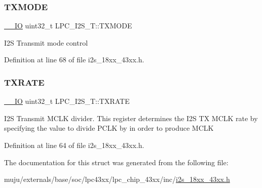 \subsubsection{\texorpdfstring{T\+X\+M\+O\+DE}{TXMODE}}
{\footnotesize\ttfamily \hyperlink{core__sc300_8h_aec43007d9998a0a0e01faede4133d6be}{\+\_\+\+\_\+\+IO} uint32\+\_\+t L\+P\+C\+\_\+\+I2\+S\+\_\+\+T\+::\+T\+X\+M\+O\+DE}

I2S Transmit mode control 

Definition at line 68 of file i2s\+\_\+18xx\+\_\+43xx.\+h.

\mbox{\label{struct_l_p_c___i2_s___t_ab62a8a48830412bcf4cec1b1ed5a5b21}} 
\subsubsection{\texorpdfstring{T\+X\+R\+A\+TE}{TXRATE}}
{\footnotesize\ttfamily \hyperlink{core__sc300_8h_aec43007d9998a0a0e01faede4133d6be}{\+\_\+\+\_\+\+IO} uint32\+\_\+t L\+P\+C\+\_\+\+I2\+S\+\_\+\+T\+::\+T\+X\+R\+A\+TE}

I2S Transmit M\+C\+LK divider. This register determines the I2S TX M\+C\+LK rate by specifying the value to divide P\+C\+LK by in order to produce M\+C\+LK 

Definition at line 64 of file i2s\+\_\+18xx\+\_\+43xx.\+h.



The documentation for this struct was generated from the following file\+:\begin{DoxyCompactItemize}
\item 
muju/externals/base/soc/lpc43xx/lpc\+\_\+chip\+\_\+43xx/inc/\hyperlink{i2s__18xx__43xx_8h}{i2s\+\_\+18xx\+\_\+43xx.\+h}\end{DoxyCompactItemize}
